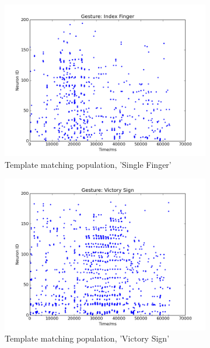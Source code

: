 \documentclass[journal]{journal}
\begin{document}
\begin{figure}
\begin{subfigure}[t]{0.24\textwidth}
		\includegraphics[width=\textwidth]{pics/figure_32_2.png}
		\caption{Template matching population, 'Single Finger'}
	    \label{fig:rec132}
	\end{subfigure}	
	\begin{subfigure}[t]{0.24\textwidth}
		\includegraphics[width=\textwidth]{pics/figure_32_3.png}
		\caption{Template matching population, 'Victory Sign'}
	\end{subfigure}	
	\\
	\begin{subfigure}[t]{0.24\textwidth}

\end{subfigure}
\end{figure}
\end{document}
